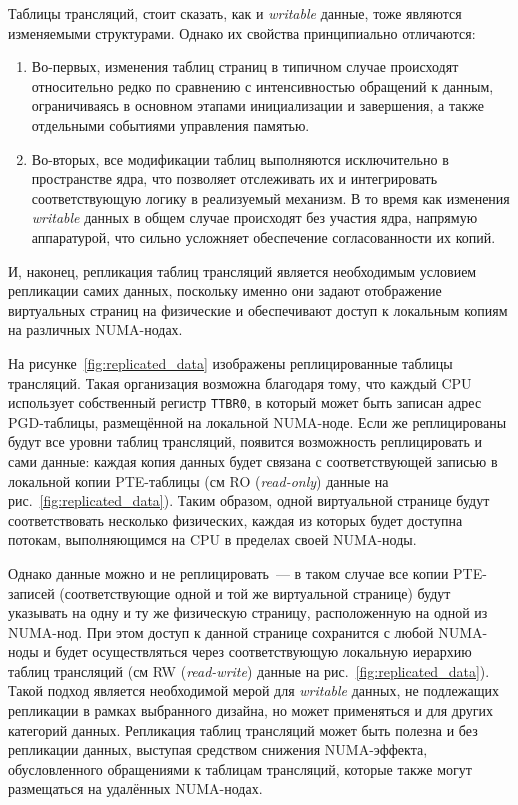 Таблицы трансляций, стоит сказать, как и \textit{writable} данные, тоже являются изменяемыми структурами. Однако их свойства принципиально отличаются:
\begin{enumerate}
    \item Во-первых, изменения таблиц страниц в типичном случае происходят относительно редко по сравнению с интенсивностью обращений к данным, ограничиваясь в основном этапами инициализации и завершения, а также отдельными событиями управления памятью.
    \item Во-вторых, все модификации таблиц выполняются исключительно в пространстве ядра, что позволяет отслеживать их и интегрировать соответствующую логику в реализуемый механизм. В то время как изменения \textit{writable} данных в общем случае происходят без участия ядра, напрямую аппаратурой, что сильно усложняет обеспечение согласованности их копий.
\end{enumerate}
И, наконец, репликация таблиц трансляций является необходимым условием репликации самих данных, поскольку именно они задают отображение виртуальных страниц на физические и обеспечивают доступ к локальным копиям на различных NUMA-нодах.

На рисунке~\ref{fig:replicated_data} изображены реплицированные таблицы трансляций. Такая организация возможна благодаря тому, что каждый CPU использует собственный регистр \texttt{TTBR0}, в который может быть записан адрес PGD-таблицы, размещённой на локальной NUMA-ноде. Если же реплицированы будут все уровни таблиц трансляций, появится возможность реплицировать и сами данные: каждая копия данных будет связана с соответствующей записью в локальной копии PTE-таблицы (см RO (\textit{read-only}) данные на рис.~\ref{fig:replicated_data}). Таким образом, одной виртуальной странице будут соответствовать несколько физических, каждая из которых будет доступна потокам, выполняющимся на CPU в пределах своей NUMA-ноды.

Однако данные можно и не реплицировать~--- в таком случае все копии PTE-записей (соответствующие одной и той же виртуальной странице) будут указывать на одну и ту же физическую страницу, расположенную на одной из NUMA-нод. При этом доступ к данной странице сохранится с любой NUMA-ноды и будет осуществляться через соответствующую локальную иерархию таблиц трансляций (см RW (\textit{read-write}) данные на рис.~\ref{fig:replicated_data}). Такой подход является необходимой мерой для \textit{writable} данных, не подлежащих репликации в рамках выбранного дизайна, но может применяться и для других категорий данных. Репликация таблиц трансляций может быть полезна и без репликации данных, выступая средством снижения NUMA-эффекта, обусловленного обращениями к таблицам трансляций, которые также могут размещаться на удалённых NUMA-нодах.

